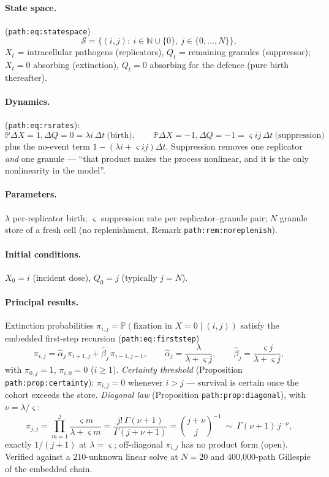 \documentclass[11pt,a4paper]{article}
\newcommand{\PR}{\mathbb{P}}
\begin{document}
\paragraph{State space.} (\texttt{path:eq:statespace})
\[
\mathcal S=\bigl\{(i,j):\ i\in\mathbb N\cup\{0\},\ j\in\{0,\ldots,N\}\bigr\},
\]
$X_t$ = intracellular pathogens (replicators), $Q_t$ = remaining granules
(suppressor); $X_t=0$ absorbing (extinction), $Q_t=0$ absorbing for the
defence (pure birth thereafter).

\paragraph{Dynamics.} (\texttt{path:eq:rsrates}):
\[
\PR{\Delta X=1,\Delta Q=0}= \lambda i\,\Delta t \ \text{(birth)},\qquad
\PR{\Delta X=-1,\Delta Q=-1}= \varsigma ij\,\Delta t \ \text{(suppression)}
\]
plus the no-event term $1-(\lambda i+\varsigma ij)\Delta t$. Suppression
removes one replicator \emph{and} one granule --- ``that product makes the
process nonlinear, and it is the only nonlinearity in the model''.

\paragraph{Parameters.} $\lambda$ per-replicator birth; $\varsigma$
suppression rate per replicator--granule pair; $N$ granule store of a fresh
cell (no replenishment, Remark \texttt{path:rem:noreplenish}).

\paragraph{Initial conditions.} $X_0=i$ (incident dose), $Q_0=j$
(typically $j=N$).

\paragraph{Principal results.} Extinction probabilities
$\pi_{i,j}=\PR(\text{fixation in }X=0\mid(i,j))$ satisfy the embedded
first-step recursion (\texttt{path:eq:firststep})
\[
\pi_{i,j}=\hat\alpha_j\,\pi_{i+1,j}+\hat\beta_j\,\pi_{i-1,j-1},\qquad
\hat\alpha_j=\frac{\lambda}{\lambda+\varsigma j},\qquad
\hat\beta_j=\frac{\varsigma j}{\lambda+\varsigma j},
\]
with $\pi_{0,j}=1$, $\pi_{i,0}=0$ ($i\ge1$). \emph{Certainty threshold}
(Proposition \texttt{path:prop:certainty}): $\pi_{i,j}=0$ whenever $i>j$
--- survival is certain once the cohort exceeds the store. \emph{Diagonal
law} (Proposition \texttt{path:prop:diagonal}), with $\nu=\lambda/\varsigma$:
\[
\pi_{j,j}=\prod_{m=1}^{j}\frac{\varsigma m}{\lambda+\varsigma m}
=\frac{j!\,\Gamma(\nu+1)}{\Gamma(j+\nu+1)}
=\binom{j+\nu}{j}^{-1}\ \sim\ \Gamma(\nu+1)\,j^{-\nu},
\]
exactly $1/(j+1)$ at $\lambda=\varsigma$; off-diagonal $\pi_{i,j}$ has no
product form (open). Verified against a $210$-unknown linear solve at
$N=20$ and 400{,}000-path Gillespie of the embedded chain.
\end{document}

